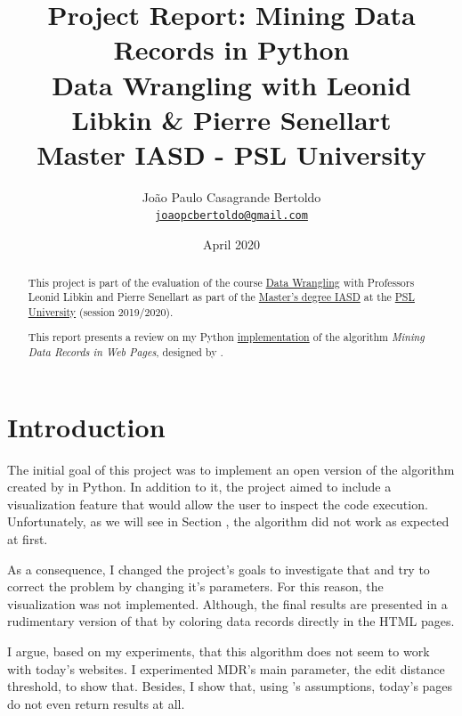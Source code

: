 \documentclass[10pt]{article}
\title{
    \huge Project Report: Mining Data Records in Python \\ 
    \medskip
    \large Data Wrangling with Leonid Libkin \& Pierre Senellart \\
    \medskip
    Master IASD - PSL University
}
\author{
    João Paulo Casagrande Bertoldo \\
    \href{mailto:joaopcbertoldo@gmail.com}{\texttt{joaopcbertoldo@gmail.com}} 
}
\date{April 2020}
\begin{document}




{
    \maketitle

    \begin{abstract}
    
    This project is part of the evaluation of the course \href{https://moodle.di.ens.fr/enrol/index.php?id=14}{Data Wrangling} with Professors Leonid Libkin and Pierre Senellart as part of the \href{https://www.lamsade.dauphine.fr/wp/iasd/en/}{Master's degree IASD} at the \href{https://www.psl.eu/en}{PSL University} (session 2019/2020).
    \medskip
    
    This report presents a review on my Python \href{https://github.com/joaopcbertoldo/pymdr/tree/0.1.1}{ implementation} of the algorithm \emph{Mining Data Records in Web Pages}, designed by \cite{mdr}. 

    \end{abstract}
}

\tableofcontents
\newpage



\section{Introduction}

The initial goal of this project was to implement an open version of the algorithm created by \cite{mdr} in Python. In addition to it, the project aimed to include a visualization feature that would allow the user to inspect the code execution. Unfortunately, as we will see in Section , the algorithm did not work as expected at first. 

As a consequence, I changed the project's goals to investigate that and try to correct the problem by changing it's parameters. For this reason, the visualization was not implemented. Although, the final results are presented in a rudimentary version of that by coloring data records directly in the HTML pages.

I argue, based on my experiments, that this algorithm does not seem to work with today's websites. I experimented MDR's main parameter, the edit distance threshold, to show that. Besides, I show that, using \citeauthor{mdr}'s assumptions, today's pages do not even return results at all.
\end{document}
